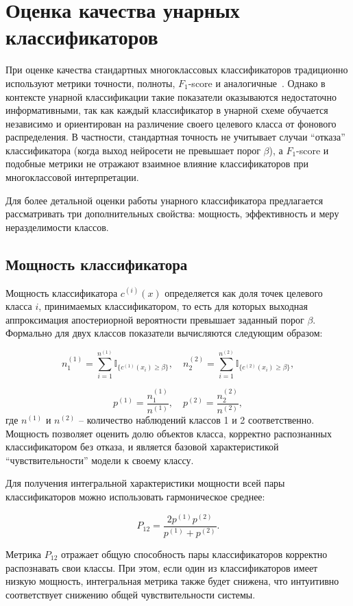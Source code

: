 \section{Оценка качества унарных классификаторов}

При оценке качества стандартных многоклассовых классификаторов традиционно используют метрики точности, полноты, \(F_1\)-score и аналогичные~\cite{obi2023comparative}. Однако в контексте унарной классификации такие показатели оказываются недостаточно информативными, так как каждый классификатор в унарной схеме обучается независимо и ориентирован на различение своего целевого класса от фонового распределения. В частности, стандартная точность не учитывает случаи ``отказа'' классификатора (когда выход нейросети не превышает порог \(\beta\)), а \(F_1\)-score и подобные метрики не отражают взаимное влияние классификаторов при многоклассовой интерпретации.

Для более детальной оценки работы унарного классификатора предлагается рассматривать три дополнительных свойства: мощность, эффективность и меру неразделимости классов.

\subsection{Мощность классификатора}

Мощность классификатора \(c^{(i)}(x)\) определяется как доля точек целевого класса \(i\), принимаемых классификатором, то есть для которых выходная аппроксимация апостериорной вероятности превышает заданный порог \(\beta\). Формально для двух классов показатели вычисляются следующим образом:

\[
n^{(1)}_1 = \sum_{i=1}^{n^{(1)}} \mathbb{I}_{\{c^{(1)}(x_i) \geq \beta\}}, \quad 
n^{(2)}_2 = \sum_{i=1}^{n^{(2)}} \mathbb{I}_{\{c^{(2)}(x_i) \geq \beta\}},
\]

\[
p^{(1)} = \frac{n^{(1)}_1}{n^{(1)}}, \quad
p^{(2)} = \frac{n^{(2)}_2}{n^{(2)}},
\]
где \(n^{(1)}\) и \(n^{(2)}\) -- количество наблюдений классов 1 и 2 соответственно. Мощность позволяет оценить долю объектов класса, корректно распознанных классификатором без отказа, и является базовой характеристикой ``чувствительности'' модели к своему классу.

Для получения интегральной характеристики мощности всей пары классификаторов можно использовать гармоническое среднее:

\[
P_{12} = \frac{2 p^{(1)} p^{(2)}}{p^{(1)} + p^{(2)}}.
\]

Метрика \(P_{12}\) отражает общую способность пары классификаторов корректно распознавать свои классы. При этом, если один из классификаторов имеет низкую мощность, интегральная метрика также будет снижена, что интуитивно соответствует снижению общей чувствительности системы.


